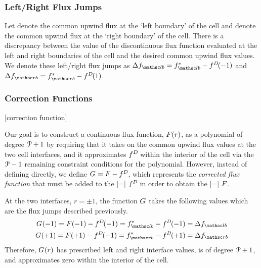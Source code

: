 
\subsubsection{Left\slash Right Flux Jumps}
\label{SEC:Intro:FR:FluxJumps}


Let \fupwL{} denote the common upwind flux at the `left boundary' of the cell
and \fupwR{} denote the common upwind flux at the `right boundary' of the cell.
%
There is a discrepancy between the value of the discontinuous flux function
evaluated at the left and right boundaries of the cell and the desired
common upwind flux values.
%
We denote these left\slash right flux jumps as
$\fluxjumpL{} = \fupwL{} - \fD\pvp[-1]$ and
$\fluxjumpR{} = \fupwR{} - \fD\pvp[ 1]$.

 

\subsubsection{Correction Functions}
\label{SEC:Intro:FR:Correction_Functions}%
[correction function]


Our goal is to construct a continuous flux function, $\fC(r)$, as a polynomial
of degree $\PO+1$ by requiring that it takes on the common upwind flux values
at the two cell interfaces, and it approximates $\fD$ within the interior of
the cell via the $\PO-1$ remaining constraint conditions for the polynomial.
%
However, instead of defining \fC{} directly, we define $\G=\fC-\fD$, which
represents the \emph{corrected flux function} that must be added to
the [=] $\fD$
in order to obtain
the [=] $\fC$.

 
At the two interfaces, $r=\pm{}1$, the function $\G$ takes the following
values which are the flux jumps described previously.
%
\begin{gather}
  \G\pvp[-1] = \fC\pvp[-1] - \fD\pvp[-1]
             = \fupwL      - \fD\pvp[-1] = \fluxjumpL{} \\
  \G\pvp[+1] = \fC\pvp[+1] - \fD\pvp[+1]
             = \fupwR      - \fD\pvp[+1] = \fluxjumpR{}
\end{gather}
%
Therefore, $\G\pvp[r]$ has prescribed left and right interface values,
is of degree $\PO+1$, and approximates zero within the interior of the cell.

